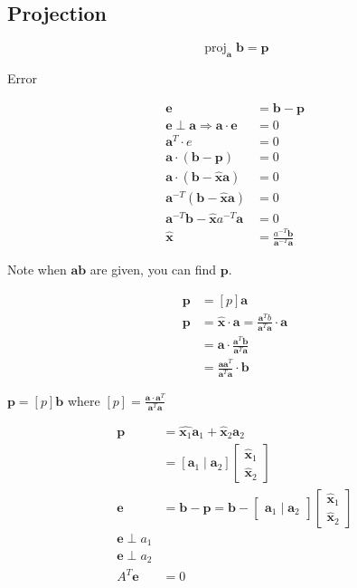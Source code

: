 \documentclass[main.tex]{subfiles}
\begin{document}
\subsection{Projection}

$$\operatorname{proj}_{\bm{a}} \bm{b} = \bm{p}$$

Error

$$
\begin{aligned}
\bm{e} &= \bm{b}-\bm{p}\\
\bm{e} \perp \bm{a} \Rightarrow \bm{a} \cdot \bm{e} &=0 \\
\bm{a}^{T} \cdot e &= 0 \\
\bm{a} \cdot (\bm{b}-\bm{p}) &= 0 \\
\bm{a} \cdot \left(\bm{b} - \hat{\bm{x}} \bm{a}\right) &= 0 \\
\bm{a}^{-T} (\bm{b} - \hat{\bm{x}} \bm{a}) &= 0\\
\bm{a}^{-T} \bm{b} - \hat{\bm{x}} a^{-T} \bm{a} &=0 \\
\hat{\bm{x}} &= \frac{a^{-T} \bm{b}} {\bm{a}^{-T} \bm{a}} 
\end{aligned}
$$

Note when $\bm{a} \bm{b}$ are given, you can find $\bm{p}$.

$$
\begin{aligned}
\bm{p} &= [p] \bm{a}\\
\bm{p} &= \hat{\bm{x}} \cdot \bm{a} =\frac{\bm{a}^{T} b}{\bm{a}^{T} \bm{a}} \cdot \bm{a}\\
& = \bm{a} \cdot \frac{\bm{a}^{T} \bm{b}}{\bm{a}^{T} \bm{a}}\\
& = \frac{\bm{a} \bm{a}^{T}}{\bm{a}^{T} \bm{a}} \cdot \bm{b}
\end{aligned}
$$

$\bm{p}= [p] \bm{b}$ where $[p]=\frac{\bm{a} \cdot \bm{a}^{T}}{\bm{a}^T \bm{a}}$

$$
\begin{aligned}
\bm{p} &= \hat{\bm{x}_1} \bm{a}_1 + \hat{\bm{x}}_{2} \bm{a}_2 \\
&= \left[ \bm{a}_1 \mid \bm{a}_2 \right] \left[\begin{array}{l}
\hat{\bm{x}}_{1} \\
\hat{\bm{x}}_{2}
\end{array}\right]\\
\bm{e}&=\bm{b}-\bm{p}=\bm{b}-\left[\begin{array}{ll}
\bm{a}_{1} \mid \bm{a}_{2}
\end{array}\right]\left[\begin{array}{l}
\hat{\bm{x}}_{1} \\
\hat{\bm{x}}_{2}
\end{array}\right]\\
\bm{e} \perp a_{1} & \\
\bm{e} \perp a_{2} & \\
A^{T} \bm{e} & =0
\end{aligned}
$$
\end{document}
